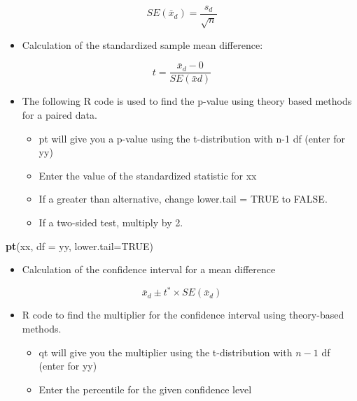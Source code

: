 \documentclass[
]{report}
\newenvironment{Shaded}{\begin{snugshade}}{\end{snugshade}}
\newcommand{\AttributeTok}[1]{\textcolor[rgb]{0.13,0.29,0.53}{#1}}
\newcommand{\ConstantTok}[1]{\textcolor[rgb]{0.56,0.35,0.01}{#1}}
\newcommand{\FunctionTok}[1]{\textcolor[rgb]{0.13,0.29,0.53}{\textbf{#1}}}
\newcommand{\NormalTok}[1]{#1}
\providecommand{\tightlist}{%
  \setlength{\itemsep}{0pt}\setlength{\parskip}{0pt}}
\begin{document}
\[SE(\bar{x}_d) = \frac{s_d}{\sqrt{n}}\]

\begin{itemize}
\tightlist
\item
  Calculation of the standardized sample mean difference:
\end{itemize}

\[t = \frac{\bar{x}_d-0}{SE(\bar{x}d)}\]

\begin{itemize}
\item
  The following R code is used to find the p-value using theory based methods for a paired data.

  \begin{itemize}
  \item
    pt will give you a p-value using the t-distribution with n-1 df (enter for yy)
  \item
    Enter the value of the standardized statistic for xx
  \item
    If a greater than alternative, change lower.tail = TRUE to FALSE.
  \item
    If a two-sided test, multiply by 2.
  \end{itemize}
\end{itemize}

\begin{Shaded}
\begin{Highlighting}[]
\FunctionTok{pt}\NormalTok{(xx, }\AttributeTok{df =}\NormalTok{ yy, }\AttributeTok{lower.tail=}\ConstantTok{TRUE}\NormalTok{)}
\end{Highlighting}
\end{Shaded}

\begin{itemize}
\tightlist
\item
  Calculation of the confidence interval for a mean difference
\end{itemize}

\[\bar{x}_d\pm t^*\times SE(\bar{x}_d)\]

\begin{itemize}
\item
  R code to find the multiplier for the confidence interval using theory-based methods.

  \begin{itemize}
  \item
    qt will give you the multiplier using the t-distribution with \(n-1\) df (enter for yy)
  \item
    Enter the percentile for the given confidence level
  \end{itemize}
\end{itemize}
\end{document}
